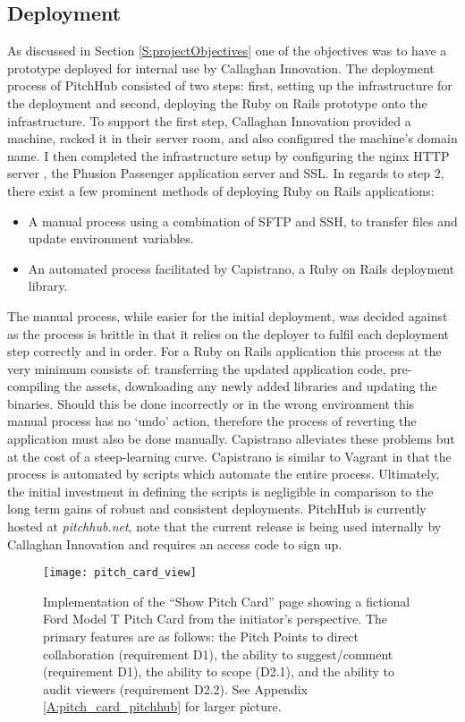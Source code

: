 \subsection{Deployment}
As discussed in Section \ref{S:projectObjectives} one of the objectives was to have a prototype deployed for internal use by Callaghan Innovation. The deployment process of PitchHub consisted of two steps: first, setting up the infrastructure for the deployment and second, deploying the Ruby on Rails prototype onto the infrastructure. To support the first step, Callaghan Innovation provided a machine, racked it in their server room, and also configured the machine's domain name. I then completed the infrastructure setup by configuring the nginx HTTP server \cite{nginx2:online}, the Phusion Passenger application server \cite{phusionPassenger:online} and SSL. In regards to step 2, there exist a few prominent methods of deploying Ruby on Rails applications:
\begin{itemize}
    \item A manual process using a combination of SFTP and SSH, to transfer files and update environment variables.
    \item An automated process facilitated by Capistrano, a Ruby on Rails deployment library.
\end{itemize}

The manual process, while easier for the initial deployment, was decided against as the process is brittle in that it relies on the deployer to fulfil each deployment step correctly and in order. For a Ruby on Rails application this process at the very minimum consists of: transferring the updated application code, pre-compiling the assets, downloading any newly added libraries and updating the binaries. Should this be done incorrectly or in the wrong environment this manual process has no `undo' action, therefore the process of reverting the application must also be done manually. Capistrano alleviates these problems but at the cost of a steep-learning curve. Capistrano is similar to Vagrant in that the process is automated by scripts which automate the entire process. Ultimately, the initial investment in defining the scripts is negligible in comparison to the long term gains of robust and consistent deployments. PitchHub is currently hosted at \textit{pitchhub.net}, note that the current release is being used internally by Callaghan Innovation and requires an access code to sign up.

\begin{figure}[ht]
    \centering
    \texttt{[image: pitch\_card\_view]}
    \caption{Implementation of the ``Show Pitch Card'' page showing a fictional Ford Model T Pitch Card from the initiator's perspective. The primary features are as follows: the Pitch Points to direct collaboration (requirement D1), the ability to suggest/comment (requirement D1), the ability to scope (D2.1), and the ability to audit viewers (requirement D2.2). See Appendix \ref{A:pitch_card_pitchhub} for larger picture.}
    \label{fig:show_pitch_card}
\end{figure}

